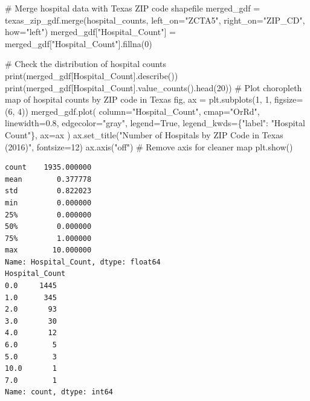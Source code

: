 \documentclass[
  letterpaper,
  DIV=11,
  numbers=noendperiod]{scrartcl}
\newenvironment{Shaded}{\begin{snugshade}}{\end{snugshade}}
\newcommand{\BuiltInTok}[1]{\textcolor[rgb]{0.00,0.23,0.31}{#1}}
\newcommand{\CommentTok}[1]{\textcolor[rgb]{0.37,0.37,0.37}{#1}}
\newcommand{\DecValTok}[1]{\textcolor[rgb]{0.68,0.00,0.00}{#1}}
\newcommand{\FloatTok}[1]{\textcolor[rgb]{0.68,0.00,0.00}{#1}}
\newcommand{\NormalTok}[1]{\textcolor[rgb]{0.00,0.23,0.31}{#1}}
\newcommand{\OperatorTok}[1]{\textcolor[rgb]{0.37,0.37,0.37}{#1}}
\newcommand{\StringTok}[1]{\textcolor[rgb]{0.13,0.47,0.30}{#1}}
\newcommand{\VariableTok}[1]{\textcolor[rgb]{0.07,0.07,0.07}{#1}}
\begin{document}
\begin{Shaded}
\begin{Highlighting}[]
\CommentTok{\# Merge hospital data with Texas ZIP code shapefile}
\NormalTok{merged\_gdf }\OperatorTok{=}\NormalTok{ texas\_zip\_gdf.merge(hospital\_counts, left\_on}\OperatorTok{=}\StringTok{"ZCTA5"}\NormalTok{, right\_on}\OperatorTok{=}\StringTok{"ZIP\_CD"}\NormalTok{, how}\OperatorTok{=}\StringTok{"left"}\NormalTok{)}
\NormalTok{merged\_gdf[}\StringTok{"Hospital\_Count"}\NormalTok{] }\OperatorTok{=}\NormalTok{ merged\_gdf[}\StringTok{"Hospital\_Count"}\NormalTok{].fillna(}\DecValTok{0}\NormalTok{)}

\CommentTok{\# Check the distribution of hospital counts}
\BuiltInTok{print}\NormalTok{(merged\_gdf[}\StringTok{\textquotesingle{}Hospital\_Count\textquotesingle{}}\NormalTok{].describe())}
\BuiltInTok{print}\NormalTok{(merged\_gdf[}\StringTok{\textquotesingle{}Hospital\_Count\textquotesingle{}}\NormalTok{].value\_counts().head(}\DecValTok{20}\NormalTok{))}
\CommentTok{\# Plot choropleth map of hospital counts by ZIP code in Texas}
\NormalTok{fig, ax }\OperatorTok{=}\NormalTok{ plt.subplots(}\DecValTok{1}\NormalTok{, }\DecValTok{1}\NormalTok{, figsize}\OperatorTok{=}\NormalTok{(}\DecValTok{6}\NormalTok{, }\DecValTok{4}\NormalTok{))}
\NormalTok{merged\_gdf.plot(}
\NormalTok{    column}\OperatorTok{=}\StringTok{"Hospital\_Count"}\NormalTok{,}
\NormalTok{    cmap}\OperatorTok{=}\StringTok{"OrRd"}\NormalTok{,}
\NormalTok{    linewidth}\OperatorTok{=}\FloatTok{0.8}\NormalTok{,}
\NormalTok{    edgecolor}\OperatorTok{=}\StringTok{"gray"}\NormalTok{,}
\NormalTok{    legend}\OperatorTok{=}\VariableTok{True}\NormalTok{,}
\NormalTok{    legend\_kwds}\OperatorTok{=}\NormalTok{\{}\StringTok{"label"}\NormalTok{: }\StringTok{"Hospital Count"}\NormalTok{\},}
\NormalTok{    ax}\OperatorTok{=}\NormalTok{ax}
\NormalTok{)}
\NormalTok{ax.set\_title(}\StringTok{"Number of Hospitals by ZIP Code in Texas (2016)"}\NormalTok{, fontsize}\OperatorTok{=}\DecValTok{12}\NormalTok{)}
\NormalTok{ax.axis(}\StringTok{"off"}\NormalTok{)  }\CommentTok{\# Remove axis for cleaner map}
\NormalTok{plt.show()}
\end{Highlighting}
\end{Shaded}

\begin{verbatim}
count    1935.000000
mean        0.377778
std         0.822023
min         0.000000
25%         0.000000
50%         0.000000
75%         1.000000
max        10.000000
Name: Hospital_Count, dtype: float64
Hospital_Count
0.0     1445
1.0      345
2.0       93
3.0       30
4.0       12
6.0        5
5.0        3
10.0       1
7.0        1
Name: count, dtype: int64
\end{verbatim}
\end{document}

